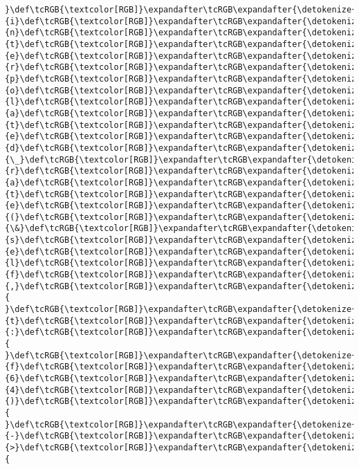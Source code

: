 \documentclass[11pt]{article}
\begin{document}
\begin{Verbatim}[commandchars=\\\{\}, frame=single, framerule=2mm, rulecolor=\color{outerrorbackground}]
}\def\tcRGB{\textcolor[RGB]}\expandafter\tcRGB\expandafter{\detokenize{95,0,135}}{i}\def\tcRGB{\textcolor[RGB]}\expandafter\tcRGB\expandafter{\detokenize{95,0,135}}{n}\def\tcRGB{\textcolor[RGB]}\expandafter\tcRGB\expandafter{\detokenize{95,0,135}}{t}\def\tcRGB{\textcolor[RGB]}\expandafter\tcRGB\expandafter{\detokenize{95,0,135}}{e}\def\tcRGB{\textcolor[RGB]}\expandafter\tcRGB\expandafter{\detokenize{95,0,135}}{r}\def\tcRGB{\textcolor[RGB]}\expandafter\tcRGB\expandafter{\detokenize{95,0,135}}{p}\def\tcRGB{\textcolor[RGB]}\expandafter\tcRGB\expandafter{\detokenize{95,0,135}}{o}\def\tcRGB{\textcolor[RGB]}\expandafter\tcRGB\expandafter{\detokenize{95,0,135}}{l}\def\tcRGB{\textcolor[RGB]}\expandafter\tcRGB\expandafter{\detokenize{95,0,135}}{a}\def\tcRGB{\textcolor[RGB]}\expandafter\tcRGB\expandafter{\detokenize{95,0,135}}{t}\def\tcRGB{\textcolor[RGB]}\expandafter\tcRGB\expandafter{\detokenize{95,0,135}}{e}\def\tcRGB{\textcolor[RGB]}\expandafter\tcRGB\expandafter{\detokenize{95,0,135}}{d}\def\tcRGB{\textcolor[RGB]}\expandafter\tcRGB\expandafter{\detokenize{95,0,135}}{\_}\def\tcRGB{\textcolor[RGB]}\expandafter\tcRGB\expandafter{\detokenize{95,0,135}}{r}\def\tcRGB{\textcolor[RGB]}\expandafter\tcRGB\expandafter{\detokenize{95,0,135}}{a}\def\tcRGB{\textcolor[RGB]}\expandafter\tcRGB\expandafter{\detokenize{95,0,135}}{t}\def\tcRGB{\textcolor[RGB]}\expandafter\tcRGB\expandafter{\detokenize{95,0,135}}{e}\def\tcRGB{\textcolor[RGB]}\expandafter\tcRGB\expandafter{\detokenize{95,0,135}}{(}\def\tcRGB{\textcolor[RGB]}\expandafter\tcRGB\expandafter{\detokenize{95,0,135}}{\&}\def\tcRGB{\textcolor[RGB]}\expandafter\tcRGB\expandafter{\detokenize{95,0,135}}{s}\def\tcRGB{\textcolor[RGB]}\expandafter\tcRGB\expandafter{\detokenize{95,0,135}}{e}\def\tcRGB{\textcolor[RGB]}\expandafter\tcRGB\expandafter{\detokenize{95,0,135}}{l}\def\tcRGB{\textcolor[RGB]}\expandafter\tcRGB\expandafter{\detokenize{95,0,135}}{f}\def\tcRGB{\textcolor[RGB]}\expandafter\tcRGB\expandafter{\detokenize{95,0,135}}{,}\def\tcRGB{\textcolor[RGB]}\expandafter\tcRGB\expandafter{\detokenize{95,0,135}}{ }\def\tcRGB{\textcolor[RGB]}\expandafter\tcRGB\expandafter{\detokenize{95,0,135}}{t}\def\tcRGB{\textcolor[RGB]}\expandafter\tcRGB\expandafter{\detokenize{95,0,135}}{:}\def\tcRGB{\textcolor[RGB]}\expandafter\tcRGB\expandafter{\detokenize{95,0,135}}{ }\def\tcRGB{\textcolor[RGB]}\expandafter\tcRGB\expandafter{\detokenize{95,0,135}}{f}\def\tcRGB{\textcolor[RGB]}\expandafter\tcRGB\expandafter{\detokenize{95,0,135}}{6}\def\tcRGB{\textcolor[RGB]}\expandafter\tcRGB\expandafter{\detokenize{95,0,135}}{4}\def\tcRGB{\textcolor[RGB]}\expandafter\tcRGB\expandafter{\detokenize{95,0,135}}{)}\def\tcRGB{\textcolor[RGB]}\expandafter\tcRGB\expandafter{\detokenize{95,0,135}}{ }\def\tcRGB{\textcolor[RGB]}\expandafter\tcRGB\expandafter{\detokenize{95,0,135}}{-}\def\tcRGB{\textcolor[RGB]}\expandafter\tcRGB\expandafter{\detokenize{95,0,135}}{>}\def\tcRGB{\textcolor[RGB]}\expandafter\tcRGB\expandafter{\detokenize{95,0,135}}{ 
\end{Verbatim}
\end{document}
